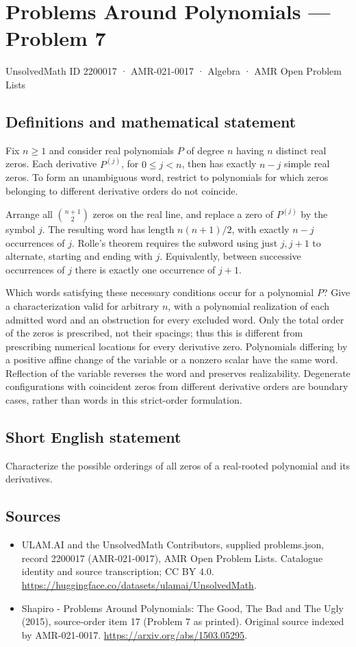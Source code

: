 \documentclass[11pt,a4paper]{article}
\begin{document}
\section*{Problems Around Polynomials — Problem 7}\label{2200017}
{\small UnsolvedMath ID 2200017 · AMR-021-0017 · Algebra · AMR Open Problem Lists}
\subsection{Definitions and mathematical statement}
Fix $n\geq1$ and consider real polynomials $P$ of degree $n$ having
$n$ distinct real zeros. Each derivative $P^{(j)}$, for
$0\leq j<n$, then has exactly $n-j$ simple real zeros. To form an
unambiguous word, restrict to polynomials for which zeros belonging
to different derivative orders do not coincide.

Arrange all $\binom{n+1}{2}$ zeros on the real line, and replace a
zero of $P^{(j)}$ by the symbol $j$. The resulting word has length
$n(n+1)/2$, with exactly $n-j$ occurrences of $j$. Rolle's theorem
requires the subword using just $j,j+1$ to alternate, starting and
ending with $j$. Equivalently, between successive occurrences of
$j$ there is exactly one occurrence of $j+1$.

Which words satisfying these necessary conditions occur for a
polynomial $P$? Give a characterization valid for arbitrary $n$,
with a polynomial realization of each admitted word and an
obstruction for every excluded word. Only the total order of the
zeros is prescribed, not their spacings; thus this is different from
prescribing numerical locations for every derivative zero.
Polynomials differing by a positive affine change of the variable
or a nonzero scalar have the same word. Reflection of the variable
reverses the word and preserves realizability. Degenerate
configurations with coincident zeros from different derivative
orders are boundary cases, rather than words in this strict-order
formulation.
\subsection{Short English statement}
Characterize the possible orderings of all zeros of a real-rooted polynomial and its derivatives.
\subsection{Sources}
\begin{itemize}
\item[S1] ULAM.AI and the UnsolvedMath Contributors, supplied problems.json, record 2200017 (AMR-021-0017), AMR Open Problem Lists. Catalogue identity and source transcription; CC BY 4.0.
\url{https://huggingface.co/datasets/ulamai/UnsolvedMath}.
\item[S2] Shapiro - Problems Around Polynomials: The Good, The Bad and The Ugly (2015), source-order item 17 (Problem 7 as printed). Original source indexed by AMR-021-0017.
\url{https://arxiv.org/abs/1503.05295}.
\end{itemize}
\end{document}
